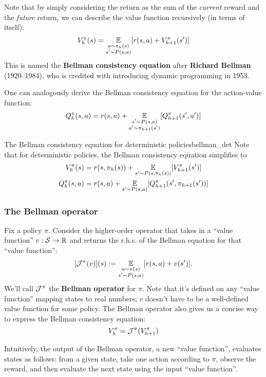 \documentclass[../main/main]{subfiles}
\begin{document}
Note that by simply considering the return as the sum of the \emph{current} reward and the \emph{future} return, we can describe the value function recursively (in terms of itself):
\begin{equation}
    V_h^\pi(s) = \operatorname*{\mathbb{E}}_{\substack{a \sim \pi_h(s) \\ s' \sim P(s, a)}} [r(s, a) + V_{h+1}^\pi(s')] \label{eq:bellman_consistency}
\end{equation}
This is named the \textbf{Bellman consistency equation} after \textbf{Richard Bellman} (1920--1984), who is credited with introducing dynamic programming in 1953.

One can analogously derive the Bellman consistency equation for the action-value function:
\[
    Q_h^\pi(s, a) = r(s, a) + \operatorname*{\mathbb{E}}_{\substack{s' \sim P(s, a) \\ a' \sim \pi_{h+1}(s')}} [Q_{h+1}^\pi(s', a')]
\]

\begin{remark}{The Bellman consistency equation for deterministic policies}{bellman_det}
    Note that for deterministic policies, the Bellman consistency equation simplifies to
    \begin{align*}
        V_h^\pi(s) &= r(s, \pi_h(s)) + \operatorname*{\mathbb{E}}_{s' \sim P(s, \pi_h(s))} [V_{h+1}^\pi(s')] \\
        Q_h^\pi(s, a) &= r(s, a) + \operatorname*{\mathbb{E}}_{s' \sim P(s, a)} [Q_{h+1}^\pi(s', \pi_{h+1}(s'))]
    \end{align*}
\end{remark}

\subsubsection{The Bellman operator}
\label{sec:bellman_operator}

Fix a policy $\pi$. Consider the higher-order operator that takes in a ``value function'' $v : \mathcal{S} \to \mathbb{R}$ and returns the r.h.s. of the Bellman equation for that ``value function'':
\[
    [\mathcal{J}^{\pi}(v)](s) := \operatorname*{\mathbb{E}}_{\substack{a \sim \pi(s) \\ s' \sim P(s, a)}} [r(s, a) + v(s')].
\]
We'll call $\mathcal{J}^\pi$ the \textbf{Bellman operator} for $\pi$. Note that it's defined on any ``value function'' mapping states to real numbers; $v$ doesn't have to be a well-defined value function for some policy. The Bellman operator also gives us a concise way to express the Bellman consistency equation:
\[
    V_h^\pi = \mathcal{J}^{\pi}(V_{h+1}^\pi)
\]

Intuitively, the output of the Bellman operator, a new ``value function'', evaluates states as follows: from a given state, take one action according to $\pi$, observe the reward, and then evaluate the next state using the input ``value function''.
\end{document}
